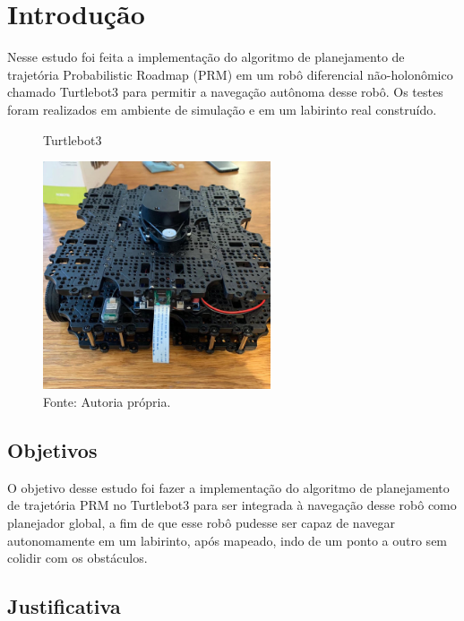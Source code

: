 \chapter{Introdução}
\label{chap:intro}

Nesse estudo foi feita a implementação do algoritmo de planejamento de trajetória Probabilistic Roadmap (PRM) em um robô diferencial não-holonômico chamado Turtlebot3 para permitir a navegação autônoma desse robô. Os testes foram realizados em ambiente de simulação e em um labirinto real construído. 

\begin{figure} [h!]	
  \centering
  \caption{Turtlebot3}
  \includegraphics[width=0.6\textwidth,trim={0 1.5cm 0 1.5cm},clip]{Figures/TurtleBot3-Waffle-Pi-robotic-platform_Q640.jpg}
  \caption*{Fonte: Autoria própria.}
  \label{fig:turt1}
\end{figure}

\section{Objetivos}
\label{sec:obj}
O objetivo desse estudo foi fazer a implementação do algoritmo de planejamento de trajetória PRM no Turtlebot3 para ser integrada à navegação desse robô como planejador global, a fim de que esse robô pudesse ser capaz de navegar autonomamente em um labirinto, após mapeado, indo de um ponto a outro sem colidir com os obstáculos.
\label{sec:obj}

\section{Justificativa}
\label{sec:justi}

